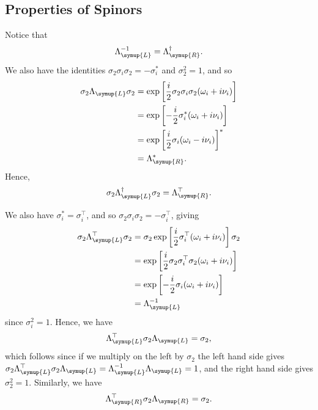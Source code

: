 \documentclass[fleqn]{NotesClass}
\newcommand{\ident}{1}
\newcommand{\hermit}{\dagger}
\newcommand{\trans}{\top}
\newcommand{\Left}{\symup{L}}
\newcommand{\Right}{\symup{R}}
\begin{document}
    \subsection{Properties of Spinors}
    Notice that
    \begin{equation}
        \Lambda_{\Left}^{-1} = \Lambda_{\Right}^\hermit.
    \end{equation}
    We also have the identities \(\sigma_2\sigma_i\sigma_2 = -\sigma_i^*\) and \(\sigma_2^2 = \ident\), and so
    \begin{align}
        \sigma_2\Lambda_{\Left}\sigma_2 &= \exp\left[ \frac{i}{2}\sigma_2 \sigma_i \sigma_2 (\omega_i + i\nu_i) \right]\\
        &= \exp\left[ -\frac{i}{2}\sigma_i^* (\omega_i + i\nu_i) \right]\\
        &= \exp\left[ \frac{i}{2}\sigma_i(\omega_i - i\nu_i) \right]^*\\
        &= \Lambda_{\Right}^*.
    \end{align}
    Hence,
    \begin{equation}
        \sigma_2 \Lambda_{\Left}^\hermit \sigma_2 = \Lambda_{\Right}^\trans.
    \end{equation}
    
    We also have \(\sigma_i^* = \sigma_i^\trans\), and so \(\sigma_2\sigma_i\sigma_2 = -\sigma_i^\trans\), giving
    \begin{align}
        \sigma_2\Lambda_{\Left}^\trans \sigma_2 &= \sigma_2\exp\left[ \frac{i}{2}\sigma_i^\trans (\omega_i + i\nu_i) \right]\sigma_2\\
        &= \exp\left[ \frac{i}{2}\sigma_2 \sigma_i^\trans \sigma_2(\omega_i + i \nu_i) \right] \\
        &= \exp\left[ -\frac{i}{2}\sigma_i (\omega_i + i\nu_i) \right]\\
        &= \Lambda_{\Left}^{-1}
    \end{align}
    since \(\sigma_i^2 = \ident\).
    Hence, we have
    \begin{equation}
        \Lambda_{\Left}^\trans \sigma_2 \Lambda_{\Left} = \sigma_2,
    \end{equation}
    which follows since if we multiply on the left by \(\sigma_2\) the left hand side gives \(\sigma_2\Lambda_{\Left}^\trans \sigma_2 \Lambda_{\Left} = \Lambda_{\Left}^{-1}\Lambda_{\Left} = \ident\), and the right hand side gives \(\sigma_2^2 = \ident\).
    Similarly, we have
    \begin{equation}
        \Lambda_{\Right}^\trans \sigma_2 \Lambda_{\Right} = \sigma_2.
    \end{equation}
    
\end{document}
